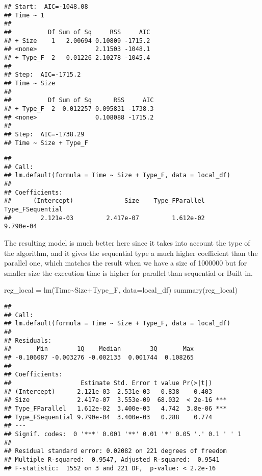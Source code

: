 \documentclass[
]{article}
\newenvironment{Shaded}{\begin{snugshade}}{\end{snugshade}}
\newcommand{\AttributeTok}[1]{\textcolor[rgb]{0.77,0.63,0.00}{#1}}
\newcommand{\FunctionTok}[1]{\textcolor[rgb]{0.00,0.00,0.00}{#1}}
\newcommand{\NormalTok}[1]{#1}
\newcommand{\OtherTok}[1]{\textcolor[rgb]{0.56,0.35,0.01}{#1}}
\newcommand{\SpecialCharTok}[1]{\textcolor[rgb]{0.00,0.00,0.00}{#1}}
\begin{document}
\begin{verbatim}
## Start:  AIC=-1048.08
## Time ~ 1
## 
##          Df Sum of Sq     RSS     AIC
## + Size    1   2.00694 0.10809 -1715.2
## <none>                2.11503 -1048.1
## + Type_F  2   0.01226 2.10278 -1045.4
## 
## Step:  AIC=-1715.2
## Time ~ Size
## 
##          Df Sum of Sq      RSS     AIC
## + Type_F  2  0.012257 0.095831 -1738.3
## <none>                0.108088 -1715.2
## 
## Step:  AIC=-1738.29
## Time ~ Size + Type_F
\end{verbatim}

\begin{verbatim}
## 
## Call:
## lm.default(formula = Time ~ Size + Type_F, data = local_df)
## 
## Coefficients:
##      (Intercept)              Size    Type_FParallel  Type_FSequential  
##        2.121e-03         2.417e-07         1.612e-02         9.790e-04
\end{verbatim}

The resulting model is much better here since it takes into account the
type of the algorithm, and it gives the sequential type a much higher
coefficient than the parallel one, which matches the result when we have
a size of 1000000 but for smaller size the execution time is higher for
parallel than sequential or Built-in.

\begin{Shaded}
\begin{Highlighting}[]
\NormalTok{reg\_local }\OtherTok{=} \FunctionTok{lm}\NormalTok{(Time}\SpecialCharTok{\textasciitilde{}}\NormalTok{Size}\SpecialCharTok{+}\NormalTok{Type\_F, }\AttributeTok{data=}\NormalTok{local\_df)}
\FunctionTok{summary}\NormalTok{(reg\_local)}
\end{Highlighting}
\end{Shaded}

\begin{verbatim}
## 
## Call:
## lm.default(formula = Time ~ Size + Type_F, data = local_df)
## 
## Residuals:
##       Min        1Q    Median        3Q       Max 
## -0.106087 -0.003276 -0.002133  0.001744  0.108265 
## 
## Coefficients:
##                   Estimate Std. Error t value Pr(>|t|)    
## (Intercept)      2.121e-03  2.531e-03   0.838    0.403    
## Size             2.417e-07  3.553e-09  68.032  < 2e-16 ***
## Type_FParallel   1.612e-02  3.400e-03   4.742  3.8e-06 ***
## Type_FSequential 9.790e-04  3.400e-03   0.288    0.774    
## ---
## Signif. codes:  0 '***' 0.001 '**' 0.01 '*' 0.05 '.' 0.1 ' ' 1
## 
## Residual standard error: 0.02082 on 221 degrees of freedom
## Multiple R-squared:  0.9547, Adjusted R-squared:  0.9541 
## F-statistic:  1552 on 3 and 221 DF,  p-value: < 2.2e-16
\end{verbatim}
\end{document}
